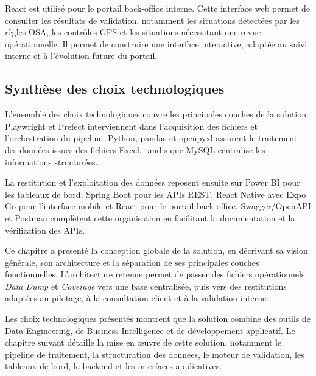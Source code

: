 React est utilisé pour le portail back-office interne. Cette interface web permet de consulter les résultats de validation, notamment les situations détectées par les règles OSA, les contrôles GPS et les situations nécessitant une revue opérationnelle. Il permet de construire une interface interactive, adaptée au suivi interne et à l’évolution future du portail.

\subsection{Synthèse des choix technologiques}

L’ensemble des choix technologiques couvre les principales couches de la solution. Playwright et Prefect interviennent dans l’acquisition des fichiers et l’orchestration du pipeline. Python, pandas et openpyxl assurent le traitement des données issues des fichiers Excel, tandis que MySQL centralise les informations structurées.

La restitution et l’exploitation des données reposent ensuite sur Power BI pour les tableaux de bord, Spring Boot pour les APIs REST, React Native avec Expo Go pour l’interface mobile et React pour le portail back-office. Swagger/OpenAPI et Postman complètent cette organisation en facilitant la documentation et la vérification des APIs.

Ce chapitre a présenté la conception globale de la solution, en décrivant sa vision générale, son architecture et la séparation de ses principales couches fonctionnelles. L’architecture retenue permet de passer des fichiers opérationnels \textit{Data Dump} et \textit{Coverage} vers une base centralisée, puis vers des restitutions adaptées au pilotage, à la consultation client et à la validation interne.

Les choix technologiques présentés montrent que la solution combine des outils de Data Engineering, de Business Intelligence et de développement applicatif. Le chapitre suivant détaille la mise en œuvre de cette solution, notamment le pipeline de traitement, la structuration des données, le moteur de validation, les tableaux de bord, le backend et les interfaces applicatives.
